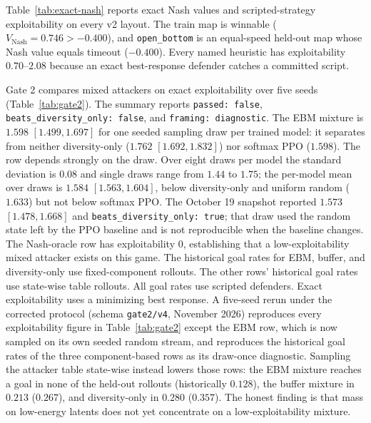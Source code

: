 \documentclass[11pt]{article}
\begin{document}
Table~\ref{tab:exact-nash} reports exact Nash values and scripted-strategy exploitability on every v2 layout.
The train map is winnable ($V_{\mathrm{Nash}}=0.746 > -0.400$), and \texttt{open\_bottom} is an equal-speed held-out map whose Nash value equals timeout ($-0.400$).
Every named heuristic has exploitability $0.70$--$2.08$ because an exact best-response defender catches a committed script.

Gate 2 compares mixed attackers on exact exploitability over five seeds (Table~\ref{tab:gate2}).
The summary reports \texttt{passed: false}, \texttt{beats\_diversity\_only: false}, and \texttt{framing: diagnostic}.
The EBM mixture is $1.598$ $[1.499,1.697]$ for one seeded sampling draw per trained model: it separates from neither diversity-only ($1.762$ $[1.692,1.832]$) nor softmax PPO ($1.598$).
The row depends strongly on the draw. Over eight draws per model the standard deviation is $0.08$ and single draws range from $1.44$ to $1.75$; the per-model mean over draws is $1.584$ $[1.563,1.604]$, below diversity-only and uniform random ($1.633$) but not below softmax PPO.
The October 19 snapshot reported $1.573$ $[1.478,1.668]$ and \texttt{beats\_diversity\_only: true}; that draw used the random state left by the PPO baseline and is not reproducible when the baseline changes.
The Nash-oracle row has exploitability $0$, establishing that a low-exploitability mixed attacker exists on this game.
The historical goal rates for EBM, buffer, and diversity-only use fixed-component rollouts.
The other rows' historical goal rates use state-wise table rollouts.
All goal rates use scripted defenders. Exact exploitability uses a minimizing best response.
A five-seed rerun under the corrected protocol (schema \texttt{gate2/v4}, November 2026) reproduces every exploitability figure in Table~\ref{tab:gate2} except the EBM row, which is now sampled on its own seeded random stream, and reproduces the historical goal rates of the three component-based rows as its draw-once diagnostic.
Sampling the attacker table state-wise instead lowers those rows: the EBM mixture reaches a goal in none of the held-out rollouts (historically $0.128$), the buffer mixture in $0.213$ ($0.267$), and diversity-only in $0.280$ ($0.357$).
The honest finding is that mass on low-energy latents does not yet concentrate on a low-exploitability mixture.
\end{document}
